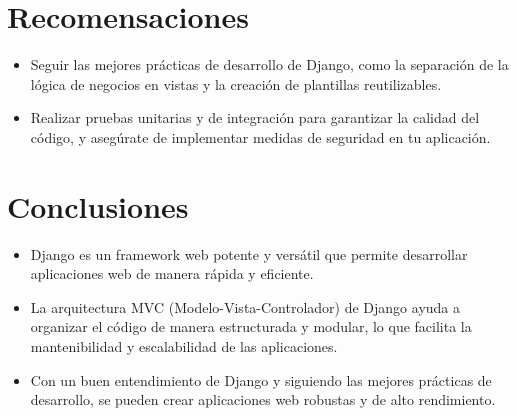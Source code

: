 \documentclass{article}
\begin{document}

  \section{Recomensaciones}
  \begin{itemize}
    \item Seguir las mejores prácticas de desarrollo de Django, como la separación de la lógica de negocios en vistas y 
    la creación de plantillas reutilizables.
    \item Realizar pruebas unitarias y de integración para garantizar la calidad del código, y asegúrate de implementar 
    medidas de seguridad en tu aplicación.
  \end{itemize}
  

  \section{Conclusiones}
  \begin{itemize}
    \item Django es un framework web potente y versátil que permite desarrollar aplicaciones web de manera rápida y eficiente.
    \item La arquitectura MVC (Modelo-Vista-Controlador) de Django ayuda a organizar el código de manera estructurada y modular, 
    lo que facilita la mantenibilidad y escalabilidad de las aplicaciones.
    \item Con un buen entendimiento de Django y siguiendo las mejores prácticas de desarrollo, se pueden crear aplicaciones web 
    robustas y de alto rendimiento.
  \end{itemize}

	\newpage
\end{document}
